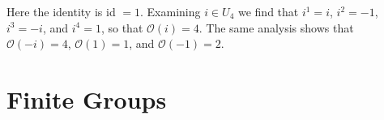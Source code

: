 \documentclass[12 pt]{article}
\numberwithin{equation}{section}
\begin{document}
Here the identity is id $=1$. Examining $i \in U_4$ we find that $i^1 = i$, $i^2 = -1$, $i^3 = -i$, and $i^4 = 1$, so that $\mathcal{O}(i) = 4$. The same analysis shows that $\mathcal{O}(-i) = 4$, $\mathcal{O}(1) = 1$, and $\mathcal{O}(-1) = 2$.



















\section{Finite Groups}
\end{document}
